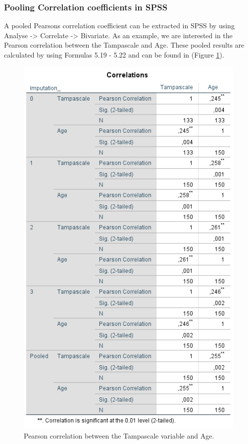 \documentclass[]{book}
\theoremstyle{definition}
\theoremstyle{definition}
\theoremstyle{definition}
\theoremstyle{remark}
\begin{document}
\subsubsection{Pooling Correlation coefficients in
SPSS}\label{pooling-correlation-coefficients-in-spss}

A pooled Pearsons correlation coefficient can be extracted in SPSS by
using Analyse -\textgreater{} Correlate -\textgreater{} Bivariate. As an
example, we are interested in the Pearson correlation between the
Tampascale and Age. These pooled results are calculated by using
Formulas 5.19 - 5.22 and can be found in (Figure \ref{fig:tab5-4}).

\begin{figure}

{\centering \includegraphics[width=0.9\linewidth]{images/table5.4} 

}

\caption{Pearson correlation between the Tampascale variable and Age.}\label{fig:tab5-4}
\end{figure}
\end{document}
